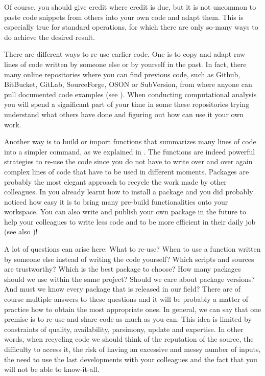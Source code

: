 Of course, you should give credit where credit is due, but it is not uncommon to paste code snippets from others into your own code and adapt them. This is especially true for standard operations, for which there are only so-many ways to do achieve the desired result.

There are different ways to re-use earlier code. One is to copy and adapt raw lines of code written by someone else or by yourself in the past. In fact, there many online repositories where you can find previous code, such as Github, BitBucket, GitLab, SourceForge, OSON or SubVersion, from where anyone can pull documented code examples (see ). When conducting computational analysis you will spend a significant part of your time in some these repositories trying understand what others have done and figuring out how can use it your own work.

Another way is to build or import functions that summarizes many lines of code into a simpler command, as we explained in . The functions are indeed powerful strategies to re-use the code since you do not have to write over and over again complex lines of code that have to be used in different moments. Packages are probably the most elegant approach to recycle the work made by other colleagues. In  you already learnt how to install a package and you did probably noticed how easy it is to bring many pre-build functionalities onto your workspace. You can also write and publish your own package in the future to help your colleagues to write less code and to be more efficient in their daily job (see also )!


A lot of questions can arise here: What to re-use? When to use a function written by someone else instead of writing the code yourself? Which scripts and sources are trustworthy? Which is the best package to choose? How many packages should we use within the same project? Should we care about package versions? And must we know every package that is released in our field? There are of course multiple answers to these questions and it will be probably a matter of practice how to obtain the most appropriate ones. In general, we can say that one premise is to re-use and share code as much as you can. This idea is limited by constraints of quality, availability, parsimony, update and expertise. In other words, when recycling code we should think of the reputation of the source, the difficulty to access it, the risk of having an excessive and messy number of inputs, the need to use the last developments with your colleagues and the fact that you will not be able to know-it-all.

